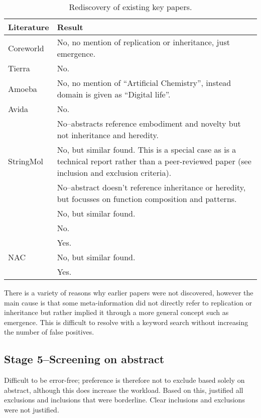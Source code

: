 \begin{table*}
\footnotesize
\begin{center}
\begin{tabular}{@{}lp{6cm}@{}}
\toprule	
Literature & Result \\
\midrule
Coreworld \cite{Rasmussen1990} & No, no mention of replication or inheritance, just emergence.\\
Tierra \cite{Ray1991} & No.\\
Amoeba \cite{Pargellis2001} & No, no mention of ``Artificial Chemistry'', instead domain is given as ``Digital life''.\\
Avida \cite{Ofria2004} & No.\\
\cite{Nellis2012}\cite{Nellis2014} & No--abstracts reference embodiment and novelty but not inheritance and heredity.\\
StringMol \cite{Hickinbotham2012} & No, but similar found. This is a special case as  \cite{Hickinbotham2012} is a technical report rather than a peer-reviewed paper (see inclusion and exclusion criteria).\\
\cite{Fontana1992}	& No--abstract doesn't reference inheritance or heredity, but focusses on function composition and patterns.\\
\cite{Dittrich1998}	& No, but similar found.	\\
\cite{Nowostawski2005} & No.\\
\cite{Fenizio2000}\cite{Fenizio2001} & Yes.	\\		
NAC \cite{Suzuki2006}    & No, but similar found.\\
\cite{Gardiner2007}  & Yes.\\
\bottomrule
\end{tabular}
\end{center}
\caption{Rediscovery of existing key papers.}
\end{table*}

There is a variety of reasons why earlier papers were not discovered, however the main cause is that some meta-information did not directly refer to replication or inheritance but rather implied it through a more general concept such as emergence. This is difficult to resolve with a keyword search without increasing the number of false positives.

\subsection{Stage 5--Screening on abstract}
Difficult to be error-free; preference is therefore not to exclude based solely on abstract, although this does increase the workload.
Based on this, justified all exclusions and inclusions that were borderline. Clear inclusions and exclusions were not justified.

